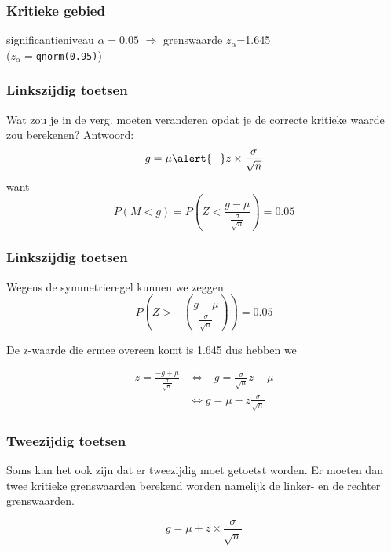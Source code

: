 \documentclass[aspectratio=169]{beamer}
\begin{document}
\begin{frame}
  \frametitle{Kritieke gebied}
  
  \centering
  
  significantieniveau $\alpha = 0.05$ $\Rightarrow$ grenswaarde $z_{\alpha}$=1.645\\
  ($z_{\alpha} = $\texttt{qnorm(0.95)})
  
\end{frame}

\begin{frame}
  \frametitle{Linkszijdig toetsen}
  
  Wat zou je in de verg.  moeten veranderen opdat je de correcte kritieke waarde zou berekenen?
  \pause
  Antwoord:
  \[g = \mu \alert{-} z \times \frac{\sigma}{\sqrt{n}} \]
  want
  \[ P(M < g) = P\left(Z < \frac{g - \mu}{\frac{\sigma}{\sqrt{n}}}\right) = 0.05 \]
  
\end{frame}

\begin{frame}
  \frametitle{Linkszijdig toetsen}
  Wegens de symmetrieregel kunnen we zeggen
  \[ P\left(Z > - \left( \frac{g - \mu}{\frac{\sigma}{\sqrt{n}}} \right) \right) = 0.05 \]
  
  De z-waarde die ermee overeen komt is 1.645 dus hebben we
  
  \begin{align*}
  z = \frac{-g + \mu}{\frac{\sigma}{\sqrt{n}}} &\Leftrightarrow -g = \frac{\sigma}{\sqrt{n}} z - \mu \\
  & \Leftrightarrow g = \mu - z \frac{\sigma}{\sqrt{n}}
  \end{align*}
  
\end{frame}

\begin{frame}
  \frametitle{Tweezijdig toetsen}
  Soms kan het ook zijn dat er tweezijdig moet getoetst worden. Er moeten dan twee kritieke grenswaarden berekend worden namelijk de linker- en de rechter grenswaarden.
  
  \begin{equation}
  g = \mu \pm z \times \frac{\sigma}{\sqrt{n}}
  \label{eq:kritiekeGrenswaarde}
  \end{equation}
\end{frame}
\end{document}
